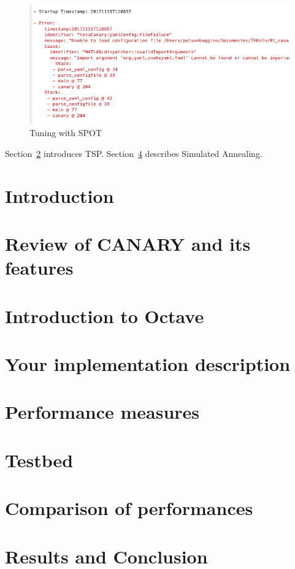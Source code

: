 \documentclass[runningheads]{llncs}
\begin{document}
\begin{figure}
\includegraphics[width=0.9\linewidth]{img/error2.png}
\caption{Tuning with SPOT}
\label{fig:tune2}
\end{figure}

Section~\ref{sec:rev} introduces TSP.
Section~\ref{sec:imp} describes Simulated Annealing.


\section{Introduction }\label{sec:sann}
\section{Review of CANARY and its features }\label{sec:rev}
\section{Introduction to Octave }\label{sec:intr}
\section{Your implementation description  }\label{sec:imp}
\section{Performance measures  }\label{sec:permes}
\section{Testbed }\label{sec:test}
\section{Comparison of performances  }\label{sec:test}
\section{Results and Conclusion }\label{sec:test}
\end{document}
